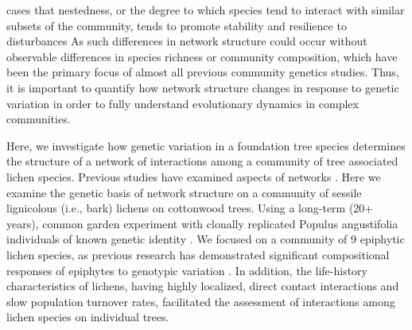 \documentclass[11pt,twocolumn,twoside,lineno]{pnas-new}
\begin{document}
cases that nestedness, or the degree to which species tend to interact
with similar subsets of the community, tends to promote stability and
resilience to disturbances \cite{Rohr2014OnSystems}%
As such differences in network structure could occur
without observable differences in species richness or community
composition, which have been the primary focus of almost all previous
community genetics studies. Thus, it is important to quantify how
network structure changes in response to genetic variation in order to
fully understand evolutionary dynamics in complex communities.

Here, we investigate how genetic variation in a foundation tree
species determines the structure of a network of interactions among a
community of tree associated lichen species. Previous studies have
examined aspects of networks \citep{Barbour2019TraitCommunities}. Here
we examine the genetic basis of network structure on a community of
sessile lignicolous (i.e., bark) lichens on cottonwood trees. Using a
long-term (20+ years), common garden experiment with clonally
replicated Populus angustifolia individuals of known genetic identity
. We focused on a community of 9 epiphytic lichen species, as previous
research has demonstrated significant compositional responses of
epiphytes to genotypic variation \citep{Winfree2011, Zytynska2011}. In
addition, the life-history characteristics of lichens, having highly
localized, direct contact interactions and slow population turnover
rates, facilitated the assessment of interactions among lichen species
on individual trees. %
\end{document}

